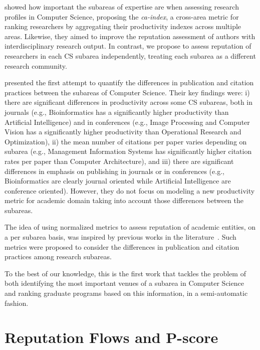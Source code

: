 \documentclass[msc]{ppgccufmg}
\begin{document}
\cite{lima2013jcdl} showed how important the subareas of expertise are when assessing research profiles in Computer Science, proposing the \textit{ca-index}, a cross-area metric for ranking researchers by aggregating their productivity indexes across multiple areas. Likewise, they aimed to improve the reputation assessment of authors with interdisciplinary research output. In contrast, we propose to assess reputation of researchers in each CS subarea independently, treating each subarea as a different research community.

\cite{wainer13} presented the first attempt to quantify the differences in publication and citation practices between the subareas of Computer Science. Their key findings were: i) there are significant differences in productivity across some CS subareas, both in journals (e.g., Bioinformatics has a significantly higher productivity than Artificial Intelligence) and in conferences (e.g., Image Processing and Computer Vision has a significantly higher productivity than Operational Research and Optimization), ii) the mean number of citations per paper varies depending on subarea (e.g., Management Information Systems has significantly higher citation rates per paper than Computer Architecture), and iii) there are significant differences in emphasis on publishing in journals or in conferences (e.g., Bioinformatics are clearly journal oriented while Artificial Intelligence are conference oriented). However, they do not focus on modeling a new productivity metric for academic domain taking into account those differences between the subareas.

{\color{blue} 
The idea of using normalized metrics to assess reputation of academic entities, on a per subarea basis, was inspired by previous works in the literature~\citep{leydesdorff13,glanzel11,opthof10,waltman13}. Such metrics were proposed to consider the differences in publication and citation practices among research subareas.

To the best of our knowledge, this is the first work that tackles the problem of both identifying the most important venues of a subarea in Computer Science and ranking graduate programs based on this information, in a semi-automatic fashion.
}


\chapter{Reputation Flows and P-score}\label{sec:pscore} 
\end{document}
